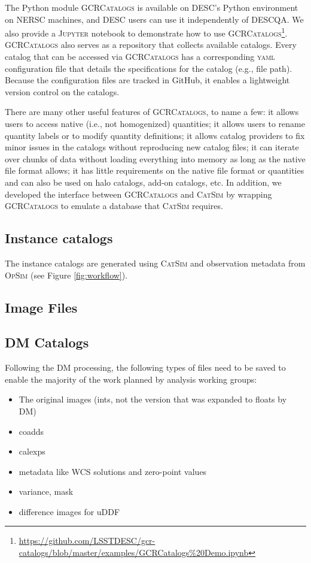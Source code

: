\documentclass[preprint,times]{aastex61}
\begin{document}
The Python module \textsc{GCRCatalogs} is available on DESC's Python environment on NERSC machines, and DESC users can use it independently of DESCQA. We also provide a \textsc{Jupyter} notebook to demonstrate how to use \textsc{GCRCatalogs}\footnote{\url{https://github.com/LSSTDESC/gcr-catalogs/blob/master/examples/GCRCatalogs\%20Demo.ipynb}}.
\textsc{GCRCatalogs} also serves as a repository that collects available catalogs. Every catalog that can be accessed via \textsc{GCRCatalogs} has a corresponding \textsc{yaml} configuration file that details the specifications for the catalog (e.g., file path). 
Because the configuration files are tracked in GitHub, it enables a lightweight version control on the catalogs. 

There are many other useful features of \textsc{GCRCatalogs}, to name a few: it allows users to access native (i.e., not homogenized) quantities; it allows users to rename quantity labels or to modify quantity definitions; it allows catalog providers to fix minor issues in the catalogs without reproducing new catalog files; it can iterate over chunks of data without loading everything into memory as long as the native file format allows; it has little requirements on the native file format or quantities and can also be used on halo catalogs, add-on catalogs, etc.
In addition, we developed the interface between \textsc{GCRCatalogs} and \textsc{CatSim} by wrapping \textsc{GCRCatalogs} to emulate a database that \textsc{CatSim} requires. 

\subsection{Instance catalogs}
The instance catalogs are generated using \textsc{CatSim} and observation metadata from \textsc{OpSim} (see Figure \ref{fig:workflow}). 
\subsection{Image Files}

\subsection{DM Catalogs}

Following the DM processing, the following types of files need to be saved to enable the majority of the work planned by analysis working groups:
\begin{itemize}
\item The original images (ints, not the version that was expanded to floats by DM)
\item coadds
\item calexps
\item metadata like WCS solutions and zero-point values
\item variance, mask
\item difference images for uDDF
\end{itemize}
\end{document}
